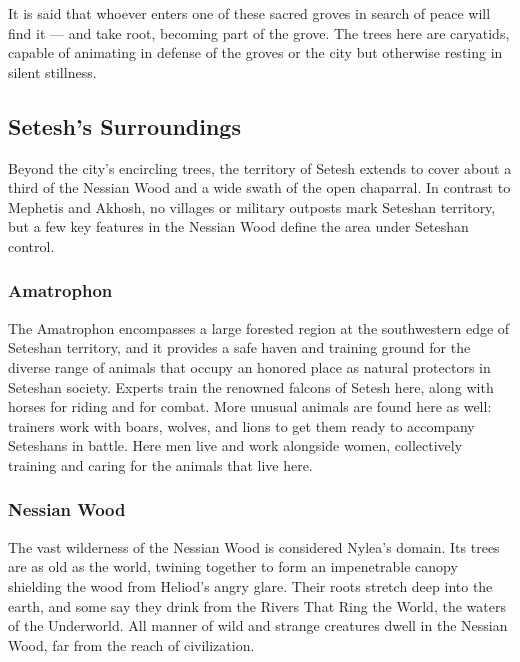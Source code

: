         \vspace{7.4cm}

        It is said that whoever enters one of these sacred groves in search of peace will find it --- and take root, becoming part of the grove.
        The trees here are caryatids, capable of animating in defense of the groves or the city but otherwise resting in silent stillness.

\subsection*{Setesh's Surroundings}
    Beyond the city's encircling trees, the territory of Setesh extends to cover about a third of the Nessian Wood and a wide swath of the open chaparral.
    In contrast to Mephetis and Akhosh, no villages or military outposts mark Seteshan territory, but a few key features in the Nessian Wood define the area under Seteshan control.

    \subsubsection{Amatrophon}
        The Amatrophon encompasses a large forested region at the southwestern edge of Seteshan territory, and it provides a safe haven and training ground for the diverse range of animals that occupy an honored place as natural protectors in Seteshan society.
        Experts train the renowned falcons of Setesh here, along with horses for riding and for combat.
        More unusual animals are found here as well: trainers work with boars, wolves, and lions to get them ready to accompany Seteshans in battle.
        Here men live and work alongside women, collectively training and caring for the animals that live here.

    \subsubsection{Nessian Wood}
        The vast wilderness of the Nessian Wood is considered Nylea's domain.
        Its trees are as old as the world, twining together to form an impenetrable canopy shielding the wood from Heliod's angry glare.
        Their roots stretch deep into the earth, and some say they drink from the Rivers That Ring the World, the waters of the Underworld.
        All manner of wild and strange creatures dwell in the Nessian Wood, far from the reach of civilization.

